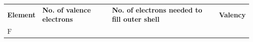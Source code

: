 \begin{enumerate}[noitemsep, label=\textbf{\arabic*}. ]
{\begin{tabular}[t]{|l|l|l|l|}
        \textbf{Element} &
    
    
        \textbf{No. of valence electrons} &
    
    
        \textbf{No. of electrons needed to fill outer shell} &
    
    
        \textbf{Valency}%
     \tabularnewline\cline{1-1}\cline{2-2}\cline{3-3}\cline{4-4}
    
    
        \begin{math}\mathrm{F}\end{math} &
    
    
         &
    
    
         &
    
    
     \tabularnewline\cline{1-1}\cline{2-2}\cline{3-3}\cline{4-4}
    

\end{tabular}}
\end{enumerate}
